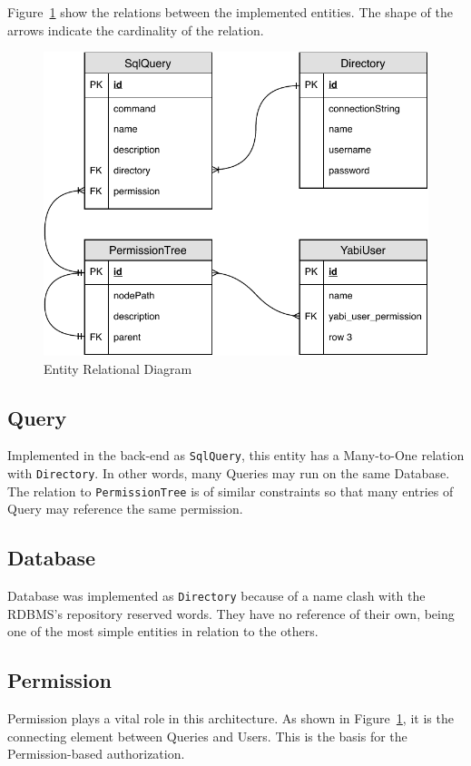 Figure~\ref{fig:er} show the relations between the implemented entities. The shape of the arrows indicate the cardinality of the relation.

\begin{figure}
  \centering
  \includegraphics[width=.7\textwidth]{images/diagramas/er}
  \caption{Entity Relational Diagram}\label{fig:er}
\end{figure}

\subsection{Query}\label{model:query}
Implemented in the back-end as \texttt{SqlQuery}, this entity has a Many-to-One relation with \texttt{Directory}. In other words, many Queries may run on the same Database. The relation to \texttt{PermissionTree} is of similar constraints so that many entries of Query may reference the same permission.

\subsection{Database}
Database was implemented as \texttt{Directory} because of a name clash with the \gls{RDBMS}'s repository reserved words. They have no reference of their own, being one of the most simple entities in relation to the others.

\subsection{Permission}

Permission plays a vital role in this architecture. As shown in Figure~\ref{fig:er}, it is the connecting element between Queries and Users. This is the basis for the Permission-based authorization.

